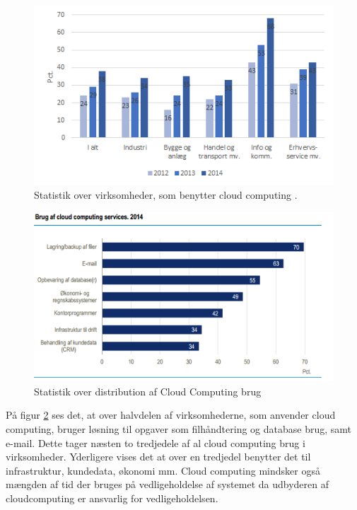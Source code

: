 \begin{figure}[H]
    \centering
    \includegraphics[width=1\textwidth]{figures/CloudComputingStatestik.png}
    \caption{Statistik over virksomheder, som benytter cloud computing \citep{itvirk}.} 
    \label{fig:virksomcc}
\end{figure}

\begin{figure}[H]
    \centering
    \includegraphics[width=1\textwidth]{figures/brugafccservices.png}
    \caption{Statistik over distribution af Cloud Computing brug \citep{itvirk}}
    \label{fig:distcc}
\end{figure}

På figur \ref{fig:distcc} ses det, at over halvdelen af virksomhederne, som anvender cloud computing, bruger løsning til opgaver som filhåndtering og database brug, samt e-mail. Dette tager næsten to tredjedele af al cloud computing brug i virksomheder. Yderligere vises det at over en tredjedel benytter det til infrastruktur, kundedata, økonomi mm. Cloud computing mindsker også mængden af tid der bruges på vedligeholdelse af systemet da udbyderen af cloudcomputing er ansvarlig for vedligeholdelsen. 


